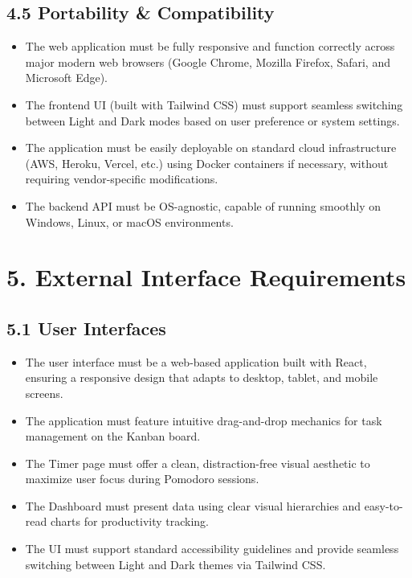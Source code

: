 \documentclass[12pt]{article}
\begin{document}
\subsection*{4.5 Portability \& Compatibility}
\begin{itemize}
    \item The web application must be fully responsive and function correctly across major modern web browsers (Google Chrome, Mozilla Firefox, Safari, and Microsoft Edge).
    \item The frontend UI (built with Tailwind CSS) must support seamless switching between Light and Dark modes based on user preference or system settings.
    \item The application must be easily deployable on standard cloud infrastructure (AWS, Heroku, Vercel, etc.) using Docker containers if necessary, without requiring vendor-specific modifications.
    \item The backend API must be OS-agnostic, capable of running smoothly on Windows, Linux, or macOS environments.
\end{itemize}

\section*{5. External Interface Requirements}

\subsection*{5.1 User Interfaces}
\begin{itemize}
    \item The user interface must be a web-based application built with React, ensuring a responsive design that adapts to desktop, tablet, and mobile screens.
    \item The application must feature intuitive drag-and-drop mechanics for task management on the Kanban board.
    \item The Timer page must offer a clean, distraction-free visual aesthetic to maximize user focus during Pomodoro sessions.
    \item The Dashboard must present data using clear visual hierarchies and easy-to-read charts for productivity tracking.
    \item The UI must support standard accessibility guidelines and provide seamless switching between Light and Dark themes via Tailwind CSS.
\end{itemize}
\end{document}
